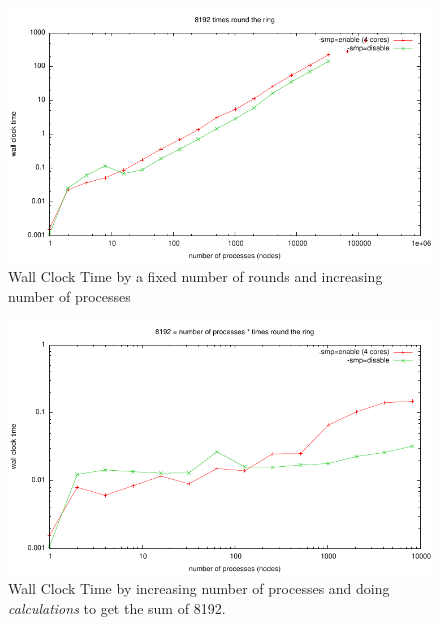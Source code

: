 \begin{figure}[h!]
	\center
	\includegraphics[width=1\textwidth]{img/8192_times_round_the_ring.pdf}
	\caption{Wall Clock Time by a fixed number of rounds and increasing number of processes}
    \label{fig:example2}
\end{figure}

\begin{figure}[h!]
	\center
	\includegraphics[width=1\textwidth]{img/8192_IS_number_x_times.pdf}
	\caption{Wall Clock Time by increasing number of processes and doing \textit{calculations} to get the sum of 8192.}
    \label{fig:example3}
\end{figure}

% 
% 

